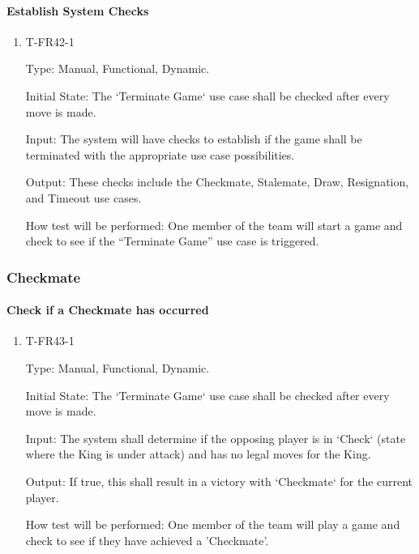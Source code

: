 \documentclass[12pt, titlepage]{article}
\begin{document}
    \paragraph{Establish System Checks}

            \begin{enumerate}

            \item{T-FR42-1\\}

                Type: Manual, Functional, Dynamic.
                					
                Initial State: The ‘Terminate Game‘ use case shall be checked after every move is made.
                					
                Input: The system will have checks to establish if the game shall be terminated with the appropriate use case possibilities. 
                					
                Output: These checks include the Checkmate, Stalemate, Draw, Resignation, and Timeout use cases.

                How test will be performed: One member of the team will start a game and check to see if the ``Terminate Game'' use case is triggered.

            \end{enumerate}

\subsubsection{Checkmate}

    \paragraph{Check if a Checkmate has occurred}

            \begin{enumerate}

            \item{T-FR43-1\\}

                Type: Manual, Functional, Dynamic.
                					
                Initial State: The ‘Terminate Game‘ use case shall be checked after every move is made.
                					
                Input: The system shall determine if the opposing player is in ‘Check‘ (state where the King is under attack) and has no legal moves for the King.
                					
                Output: If true, this shall result in a victory with ‘Checkmate‘ for the current player.

                How test will be performed: One member of the team will play a game and check to see if they have achieved a 'Checkmate'.

            \end{enumerate}
\end{document}

